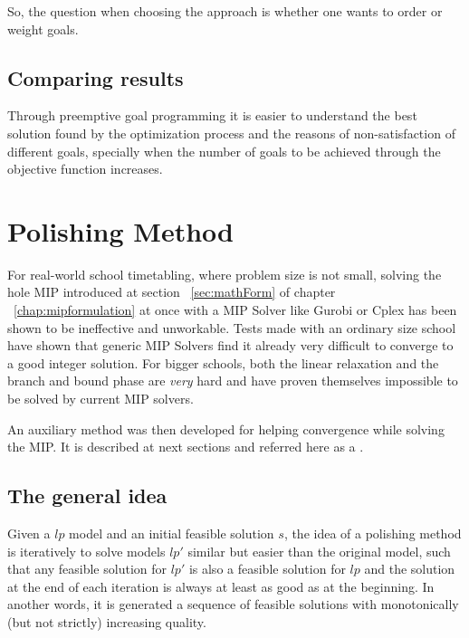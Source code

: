 So, the question when choosing the approach is whether one wants to order or weight goals.


\subsection{Comparing results}

Through preemptive goal programming it is easier to understand the best solution found by the optimization process and the reasons of non-satisfaction of different goals, specially when the number of goals to be achieved through the objective function increases.





\section{Polishing Method}

For real-world school timetabling, where problem size is not small, solving the hole MIP introduced at section ~\ref{sec:mathForm} of chapter ~\ref{chap:mipformulation} at once with a MIP Solver like Gurobi or Cplex has been shown to be ineffective and unworkable. Tests made with an ordinary size school  have shown that generic MIP Solvers find it already very difficult to converge to a good integer solution. For bigger schools, both the linear relaxation and the branch and bound phase are \textit{very} hard and have proven themselves impossible to be solved by current MIP solvers.

An auxiliary method was then developed for helping convergence while solving the MIP. It is described at next sections and referred here as a .


\subsection{The general idea}

Given a $lp$ model and an initial feasible solution $s$, the idea of a polishing method is iteratively to solve models $lp'$ similar but easier than the original model, such that any feasible solution for $lp'$ is also a feasible solution for $lp$ and the solution at the end of each iteration is always at least as good as at the beginning. In another words, it is generated a sequence of feasible solutions with monotonically (but not strictly) increasing quality.

